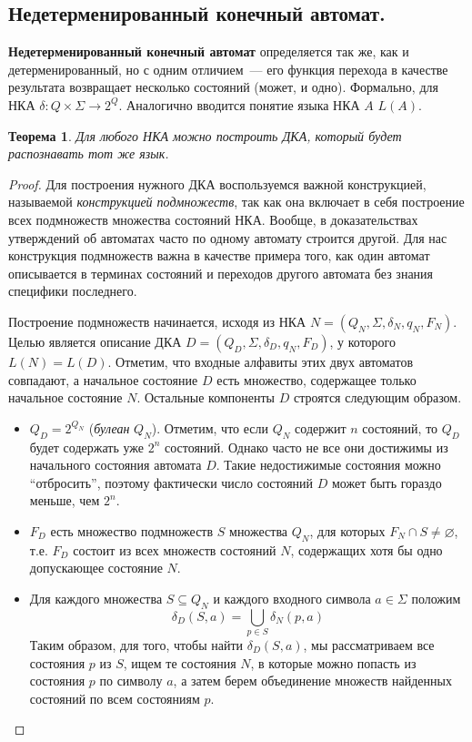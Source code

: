 \documentclass[a4paper,12pt]{article}
\newtheorem*{theorem}{Теорема}
\begin{document}
	\subsection{Недетерменированный конечный автомат.}
	\textbf{Недетерменированный конечный автомат} определяется так же, как и детерменированный, но с одним отличием~--- его функция перехода в качестве результата возвращает несколько состояний (может, и одно). Формально, для НКА \(\delta : Q \times \Sigma \to 2^{Q}\). Аналогично вводится понятие языка НКА \(A\) \(L(A)\).
	
	\begin{theorem}
		Для любого НКА можно построить ДКА, который будет распознавать тот же язык.
	\end{theorem}
	\begin{proof}
		Для построения нужного ДКА воспользуемся важной конструкцией, называемой \textit{конструкцией подмножеств}, так как она включает в себя построение всех подмножеств множества состояний НКА. Вообще, в доказательствах утверждений об автоматах часто по одному автомату строится другой. Для нас конструкция подмножеств важна в качестве примера того, как один автомат описывается в терминах состояний и переходов другого автомата без знания специфики последнего.
		
		Построение подмножеств начинается, исходя из НКА \(N = (Q_N, \Sigma, \delta_N, q_N, F_N)\). Целью является описание ДКА \(D = (Q_D, \Sigma, \delta_D, {q_N}, F_D)\), у которого \(L(N) = L(D)\). Отметим, что входные алфавиты этих двух автоматов совпадают, а начальное состояние \(D\) есть множество, содержащее только начальное состояние \(N\). Остальные компоненты \(D\) строятся следующим образом.
		\begin{itemize}
			\item \(Q_D = 2^{Q_N}\) (\textit{булеан} \(Q_N\)). Отметим, что если \(Q_N\) содержит \(n\) состояний, то \(Q_D\) будет содержать уже \(2^n\) состояний. Однако часто не все они достижимы из начального состояния автомата \(D\). Такие недостижимые состояния можно ``отбросить'', поэтому фактически число состояний \(D\) может быть гораздо меньше, чем \(2^n\).
			\item \(F_D\) есть множество подмножеств \(S\) множества \(Q_N\), для которых \(F_N \cap S \neq \varnothing\), т.е. \(F_D\) состоит из всех множеств состояний \(N\), содержащих хотя бы одно допускающее состояние \(N\).
			\item Для каждого множества \(S \subseteq Q_N\) и каждого входного символа \(a \in \Sigma\) положим
			\[\delta_D(S, a) = \bigcup_{p \in S} \delta_N(p, a)\]
			Таким образом, для того, чтобы найти \(\delta_D(S, a)\), мы рассматриваем все состояния \(p\) из \(S\), ищем те состояния \(N\), в которые можно попасть из состояния \(p\) по символу \(a\), а затем берем объединение множеств найденных состояний по всем состояниям \(p\).
		\end{itemize}
		

\end{proof}
\end{document}

